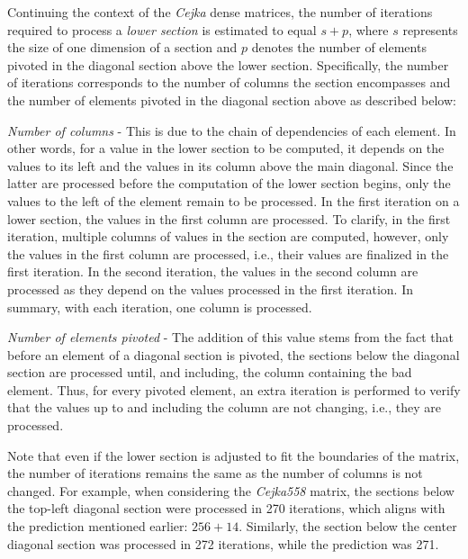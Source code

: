 Continuing the context of the \textit{Cejka} dense matrices, the number of iterations required to process a \textit{lower section} is estimated to equal $s + p$, where $s$ represents the size of one dimension of a section and $p$ denotes the number of elements pivoted in the diagonal section above the lower section.
Specifically, the number of iterations corresponds to the number of columns the section encompasses and the number of elements pivoted in the diagonal section above as described below:

\begin{tight_itemize}
	\item \textit{Number of columns} - This is due to the chain of dependencies of each element.
In other words, for a value in the lower section to be computed, it depends on the values to its left and the values in its column above the main diagonal.
		Since the latter are processed before the computation of the lower section begins, only the values to the left of the element remain to be processed.
In the first iteration on a lower section, the values in the first column are processed.
To clarify, in the first iteration, multiple columns of values in the section are computed, however, only the values in the first column are processed, i.e., their values are finalized in the first iteration.
In the second iteration, the values in the second column are processed as they depend on the values processed in the first iteration.
In summary, with each iteration, one column is processed.
	\item \textit{Number of elements pivoted} - The addition of this value stems from the fact that before an element of a diagonal section is pivoted, the sections below the diagonal section are processed until, and including, the column containing the bad element.
Thus, for every pivoted element, an extra iteration is performed to verify that the values up to and including the column are not changing, i.e., they are processed.
\end{tight_itemize}

Note that even if the lower section is adjusted to fit the boundaries of the matrix, the number of iterations remains the same as the number of columns is not changed.
For example, when considering the \textit{Cejka558} matrix, the sections below the top-left diagonal section were processed in 270 iterations, which aligns with the prediction mentioned earlier: $256 + 14$.
Similarly, the section below the center diagonal section was processed in 272 iterations, while the prediction was 271.

